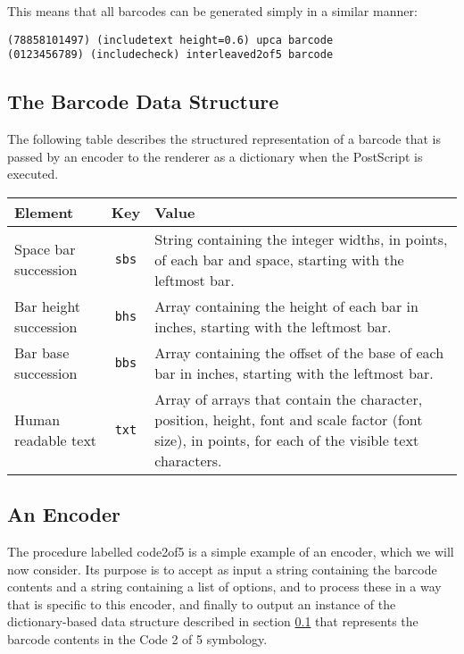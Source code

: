 \documentclass{article}
\begin{document}
This means that all barcodes can be generated simply in a similar
manner:

\begin{lstlisting}
(78858101497) (includetext height=0.6) upca barcode
(0123456789) (includecheck) interleaved2of5 barcode
\end{lstlisting}


\subsection{The Barcode Data Structure}
\label{datastructure}
The following table describes the structured representation of a
barcode that is passed by an encoder to the renderer as a
dictionary when the PostScript is executed.

\begin{center}

\begin{tabular}{l|c|p{6.5cm}}
Element               & Key  & Value \\
\hline
Space bar succession  & \texttt{sbs}  & 
String containing the integer widths, in points, of each bar and 
space, starting with the leftmost bar.\\ 

Bar height succession & \texttt{bhs}  &
Array containing the height of each bar in inches, starting with 
the leftmost bar.\\

Bar base succession   & \texttt{bbs}  &  
Array containing the offset of the base of each bar in inches,
starting with the leftmost bar.\\

Human readable text   & \texttt{txt}  &
Array of arrays that contain the character, position, height,
font and scale factor (font size), in points, for each of the visible 
text characters.
\end{tabular}

\end{center}


\subsection{An Encoder}

The procedure labelled code2of5 is a simple example of an encoder,
which we will now consider. Its purpose is to accept as input a string
containing the barcode contents and a string containing a list of options, 
and to process these in a way
that is specific to this encoder, and finally to output an
instance of the dictionary-based data structure described in section
\ref{datastructure} that represents the barcode contents in the 
Code 2 of 5 symbology.
\end{document}
